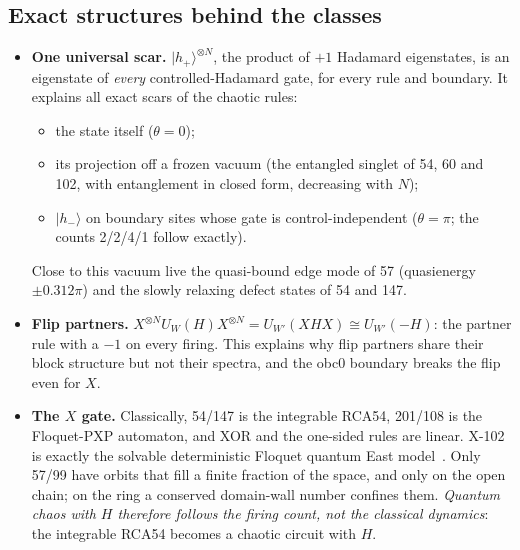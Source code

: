 \subsection{Exact structures behind the classes}
\begin{itemize}
\item \textbf{One universal scar.} $|h_+\rangle^{\otimes N}$, the product of $+1$ Hadamard eigenstates, is an eigenstate
  of \emph{every} controlled-Hadamard gate, for every rule and boundary. It explains all exact scars of the chaotic
  rules:
  \begin{itemize}
  \item the state itself ($\theta=0$);
  \item its projection off a frozen vacuum (the entangled singlet of 54, 60 and 102, with entanglement in closed form,
    decreasing with $N$);
  \item $|h_-\rangle$ on boundary sites whose gate is control-independent ($\theta=\pi$; the counts 2/2/4/1 follow
    exactly).
  \end{itemize}
  Close to this vacuum live the quasi-bound edge mode of 57 (quasienergy $\pm0.312\pi$) and the slowly relaxing defect
  states of 54 and 147.
\item \textbf{Flip partners.} $X^{\otimes N}U_W(H)X^{\otimes N}=U_{W'}(XHX)\cong U_{W'}(-H)$: the partner rule with a
  $-1$ on every firing. This explains why flip partners share their block structure but not their spectra, and the obc0
  boundary breaks the flip even for $X$.
\item \textbf{The $X$ gate.} Classically, 54/147 is the integrable RCA54, 201/108 is the Floquet-PXP automaton, and
  XOR and the one-sided rules are linear. X-102 is exactly the solvable deterministic Floquet quantum East
  model~\cite{bertini2024det}. Only 57/99 have orbits that fill a finite fraction of the space, and only on the open
  chain; on the ring a conserved domain-wall number confines them. \emph{Quantum chaos with $H$ therefore follows the
  firing count, not the classical dynamics}: the integrable RCA54 becomes a chaotic circuit with $H$.
\end{itemize}

